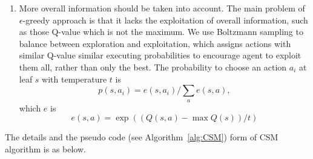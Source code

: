 \documentclass[conference]{IEEEtran}
\begin{document}
\begin{enumerate}
		\item More overall information should be taken into account. The main problem of
		$\epsilon$-greedy approach is that it lacks the exploitation of overall information,
		such as those Q-value which is not the maximum. We use Boltzmann sampling to balance between
		exploration and exploitation, which assigns actions with similar Q-value similar executing
		probabilities to encourage agent to exploit them all, rather than only the best.
		The probability to choose an action $a_i$ at leaf $s$ with temperature $t$ is
		\begin{equation}
		p(s, a_i) = e(s, a_i)/ \sum_a{e(s, a)} \label{equ:boltzmann},
		\end{equation}  
		which $e$ is
		\begin{equation}
		e(s, a) = \exp( (Q(s, a) - \max Q(s))/t )
		\end{equation}
		
	\end{enumerate}
	
	The details and the pseudo code (see Algorithm~\ref{alg:CSM}) form of CSM algorithm is as below.
	
\end{document}
